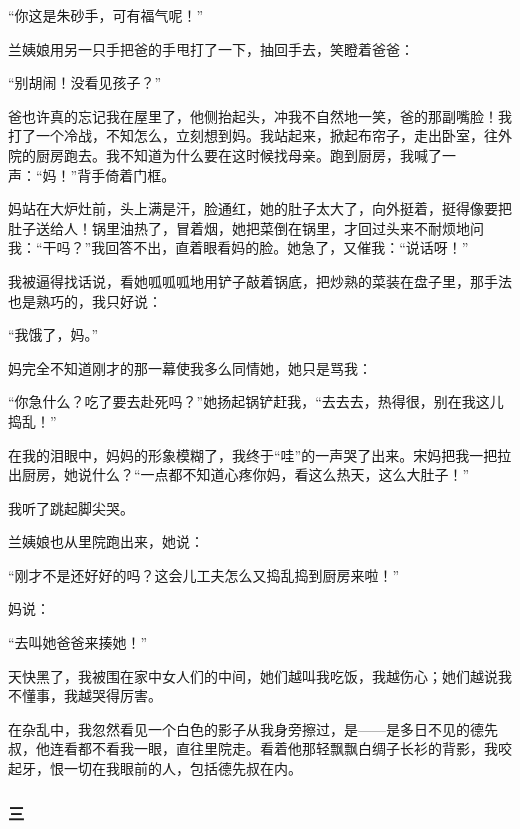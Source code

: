 \par “你这是朱砂手，可有福气呢！”
\par 兰姨娘用另一只手把爸的手甩打了一下，抽回手去，笑瞪着爸爸：
\par “别胡闹！没看见孩子？”
\par 爸也许真的忘记我在屋里了，他侧抬起头，冲我不自然地一笑，爸的那副嘴脸！我打了一个冷战，不知怎么，立刻想到妈。我站起来，掀起布帘子，走出卧室，往外院的厨房跑去。我不知道为什么要在这时候找母亲。跑到厨房，我喊了一声：“妈！”背手倚着门框。
\par 妈站在大炉灶前，头上满是汗，脸通红，她的肚子太大了，向外挺着，挺得像要把肚子送给人！锅里油热了，冒着烟，她把菜倒在锅里，才回过头来不耐烦地问我：“干吗？”我回答不出，直着眼看妈的脸。她急了，又催我：“说话呀！”
\par 我被逼得找话说，看她呱呱呱地用铲子敲着锅底，把炒熟的菜装在盘子里，那手法也是熟巧的，我只好说：
\par “我饿了，妈。”
\par 妈完全不知道刚才的那一幕使我多么同情她，她只是骂我：
\par “你急什么？吃了要去赴死吗？”她扬起锅铲赶我，“去去去，热得很，别在我这儿捣乱！”
\par 在我的泪眼中，妈妈的形象模糊了，我终于“哇”的一声哭了出来。宋妈把我一把拉出厨房，她说什么？“一点都不知道心疼你妈，看这么热天，这么大肚子！”
\par 我听了跳起脚尖哭。
\par 兰姨娘也从里院跑出来，她说：
\par “刚才不是还好好的吗？这会儿工夫怎么又捣乱捣到厨房来啦！”
\par 妈说：
\par “去叫她爸爸来揍她！”
\par 天快黑了，我被围在家中女人们的中间，她们越叫我吃饭，我越伤心；她们越说我不懂事，我越哭得厉害。
\par 在杂乱中，我忽然看见一个白色的影子从我身旁擦过，是——是多日不见的德先叔，他连看都不看我一眼，直往里院走。看着他那轻飘飘白绸子长衫的背影，我咬起牙，恨一切在我眼前的人，包括德先叔在内。

\subsubsection*{三}

